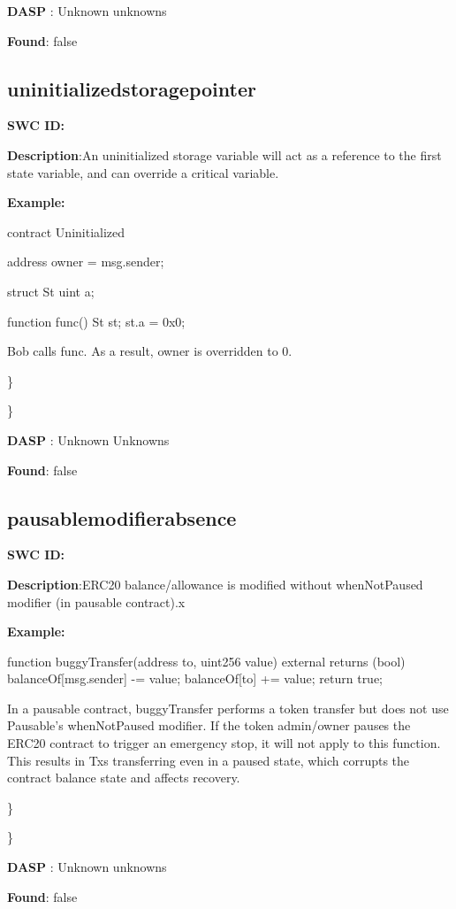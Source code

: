 \documentclass{article}
\begin{document}
{\textbf{DASP} : Unknown unknowns

\textbf{Found}: false

\subsection{uninitialized\textunderscore storage\textunderscore pointer} 
\textbf{SWC \textunderscore ID:} 

\textbf{Description}:An uninitialized storage variable will act as a reference to the first state variable, and can override a critical variable.


\textbf{Example:} 

contract Uninitialized{
    address owner = msg.sender;

    struct St{
        uint a;
    }

    function func() {
        St st;
        st.a = 0x0;
    }
}
Bob calls func. As a result, owner is overridden to 0.

\} 

\} 

\textbf{DASP} : Unknown Unknowns

\textbf{Found}: false

\subsection{pausable\textunderscore modifier\textunderscore absence} 
\textbf{SWC \textunderscore ID:} 

\textbf{Description}:ERC20 balance/allowance is modified without whenNotPaused modifier (in pausable contract).x


\textbf{Example:} 

function buggyTransfer(address to, uint256 value) external returns (bool){
        balanceOf[msg.sender] -= value;
        balanceOf[to] += value;
        return true;
    }

In a pausable contract, buggyTransfer performs a token transfer but does not use Pausable's whenNotPaused modifier. If the token admin/owner pauses the ERC20 contract to trigger an emergency stop, it will not apply to this function. This results in Txs transferring even in a paused state, which corrupts the contract balance state and affects recovery.

\} 

\} 

\textbf{DASP} : Unknown unknowns

\textbf{Found}: false

}
\end{document}
